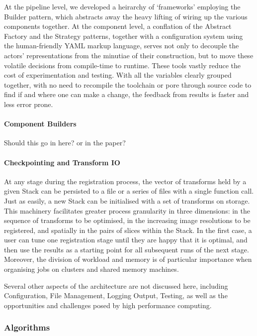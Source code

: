         At the pipeline level, we developed a heirarchy of `frameworks' employing the Builder pattern, which abstracts away the heavy lifting of wiring up the various components together.  At the component level, a conflation of the Abstract Factory and the Strategy patterns, together with a configuration system using the human-friendly YAML markup language, serves not only to decouple the actors' representations from the minutiae of their construction, but to move these volatile decisions from compile-time to runtime. These tools vastly reduce the cost of experimentation and testing. With all the variables clearly grouped together, with no need to recompile the toolchain or pore through source code to find if and where one can make a change, the feedback from results is faster and less error prone.
      
      \paragraph{Component Builders}
      Should this go in here? or in the paper? 
      
      \paragraph{Checkpointing and Transform IO}
        At any stage during the registration process, the vector of transforms held by a given Stack can be persisted to a file or a series of files with a single function call. Just as easily, a new Stack can be initialised with a set of transforms on storage. This machinery facilitates greater process granularity in three dimensions: in the sequence of transforms to be optimised, in the increasing image resolutions to be registered, and spatially in the pairs of slices within the Stack. In the first case, a user can tune one registration stage until they are happy that it is optimal, and then use the results as a starting point for all subsequent runs of the next stage. Moreover, the division of workload and memory is of particular importance when organising jobs on clusters and shared memory machines.
  
        \vspace{3 mm}

        Several other aspects of the architecture are not discussed here, including Configuration, File Management, Logging Output, Testing, as well as the opportunities and challenges posed by high performance computing.
  \subsubsection{Algorithms}
